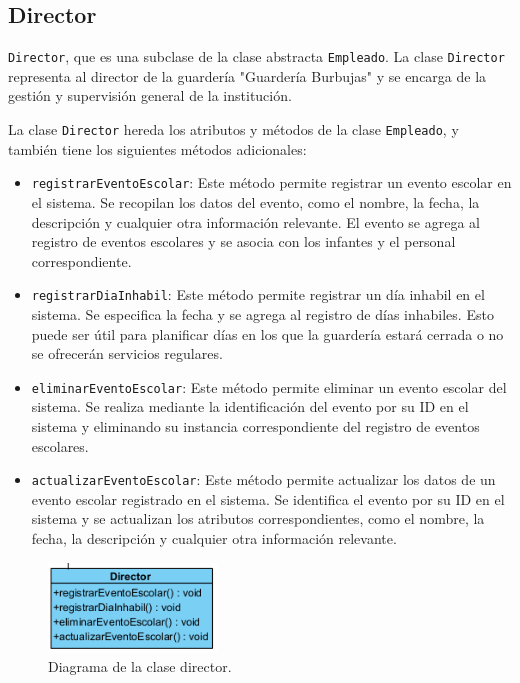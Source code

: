 \clearpage
\subsection{Director}

\texttt{Director}, que es una subclase de la clase abstracta \texttt{Empleado}. La clase \texttt{Director} representa al director de la guardería "Guardería Burbujas" y se encarga de la gestión y supervisión general de la institución.

La clase \texttt{Director} hereda los atributos y métodos de la clase \texttt{Empleado}, y también tiene los siguientes métodos adicionales:

\begin{itemize}
\item \texttt{registrarEventoEscolar}: Este método permite registrar un evento escolar en el sistema. Se recopilan los datos del evento, como el nombre, la fecha, la descripción y cualquier otra información relevante. El evento se agrega al registro de eventos escolares y se asocia con los infantes y el personal correspondiente.

\item \texttt{registrarDiaInhabil}: Este método permite registrar un día inhabil en el sistema. Se especifica la fecha y se agrega al registro de días inhabiles. Esto puede ser útil para planificar días en los que la guardería estará cerrada o no se ofrecerán servicios regulares.

\item \texttt{eliminarEventoEscolar}: Este método permite eliminar un evento escolar del sistema. Se realiza mediante la identificación del evento por su ID en el sistema y eliminando su instancia correspondiente del registro de eventos escolares.

\item \texttt{actualizarEventoEscolar}: Este método permite actualizar los datos de un evento escolar registrado en el sistema. Se identifica el evento por su ID en el sistema y se actualizan los atributos correspondientes, como el nombre, la fecha, la descripción y cualquier otra información relevante.

\end{itemize}



\begin{figure}[htbp]
\centering
\includegraphics[width=0.4\textwidth]{images/arqui/director.png}
\caption{Diagrama de la clase director.}
\label{fig:entidadDirector}
\end{figure}

